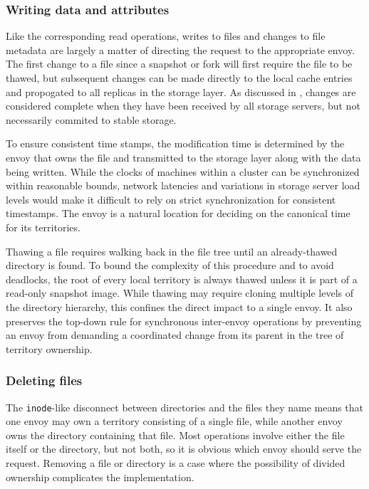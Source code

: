 \subsubsection{Writing data and attributes}

Like the corresponding read operations, writes to files and changes to file metadata are largely a matter of directing the request to the appropriate envoy. The first change to a file since a snapshot or fork will first require the file to be thawed, but subsequent changes can be made directly to the local cache entries and propogated to all replicas in the storage layer. As discussed in , changes are considered complete when they have been received by all storage servers, but not necessarily commited to stable storage.

To ensure consistent time stamps, the modification time is determined by the envoy that owns the file and transmitted to the storage layer along with the data being written. While the clocks of machines within a cluster can be synchronized within reasonable bounds, network latencies and variations in storage server load levels would make it difficult to rely on strict synchronization for consistent timestamps. The envoy is a natural location for deciding on the canonical time for its territories.

Thawing a file requires walking back in the file tree until an already-thawed directory is found. To bound the complexity of this procedure and to avoid deadlocks, the root of every local territory is always thawed unless it is part of a read-only snapshot image. While thawing may require cloning multiple levels of the directory hierarchy, this confines the direct impact to a single envoy. It also preserves the top-down rule for synchronous inter-envoy operations by preventing an envoy from demanding a coordinated change from its parent in the tree of territory ownership.

\subsubsection{Deleting files}

The \texttt{inode}-like disconnect between directories and the files they name means that one envoy may own a territory consisting of a single file, while another envoy owns the directory containing that file. Most operations involve either the file itself or the directory, but not both, so it is obvious which envoy should serve the request. Removing a file or directory is a case where the possibility of divided ownership complicates the implementation.

